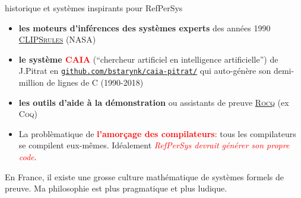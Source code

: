 \documentclass[final,a4]{beamer}
\begin{document}
 \begin{frame}{historique et systèmes inspirants pour RefPerSys}

   \begin{itemize}

   \item \textbf{les moteurs d'inférences des systèmes experts} des années 1990
     \href{https://clipsrules.net/}{\textsc{CLIPSrules}} (NASA)

   \item \textbf{le système \textcolor{red}{CAIA}} (``chercheur
     artificiel en intelligence artificielle'') de J.Pitrat en
     {\texttt{\href{https://github.com/bstarynk/caia-pitrat}{github.com/bstarynk/caia-pitrat/}}}
     qui auto-génère son demi-million de lignes de C (1990-2018)
     
   \item \textbf{les outils d'aide à la démonstration} ou assistants
     de preuve \href{https://rocq-prover.org/}{\textsc{Rocq}} (ex
     \textsc{Coq})

     \item La problèmatique de \textbf{\textcolor{red}{l'amorçage des
         compilateurs}}: tous les compilateurs se compilent
       eux-mêmes. Idéalement \textit{\textcolor{red}{RefPerSys devrait générer son
         propre code}}.
   \end{itemize}

   \bigskip

   En France, il existe une grosse culture mathématique de systèmes
   formels de preuve. Ma philosophie est plus pragmatique et plus ludique.
   
 \end{frame}
 
\end{document}
